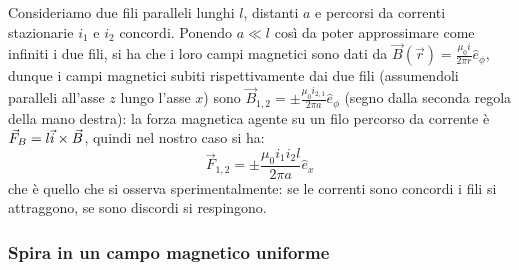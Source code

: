 Consideriamo due fili paralleli lunghi $ l $, distanti $ a $ e percorsi da correnti stazionarie $ i_1 $ e $ i_2 $ concordi. Ponendo $ a \ll l $ così da poter approssimare come infiniti i due fili, si ha che i loro campi magnetici sono dati da $ \vec{B}(\vec{r}) = \frac{\mu_0 i}{2\pi r} \hat{e}_{\phi} $, dunque i campi magnetici subiti rispettivamente dai due fili (assumendoli paralleli all'asse $ z $ lungo l'asse $ x $) sono $ \vec{B}_{1,2} = \pm \frac{\mu_0 i_{2,1}}{2\pi a} \hat{e}_{\phi} $ (segno dalla seconda regola della mano destra): la forza magnetica agente su un filo percorso da corrente è $ \vec{F}_B = l \vec{i}\times\vec{B} $, quindi nel nostro caso si ha:
\begin{equation}
	\vec{F}_{1,2} = \pm \frac{\mu_0 i_1 i_2 l}{2 \pi a} \hat{e}_x
	\label{eq:forza-fili}
\end{equation}
che è quello che si osserva sperimentalmente: se le correnti sono concordi i fili si attraggono, se sono discordi si respingono.

\subsubsection{Spira in un campo magnetico uniforme}

